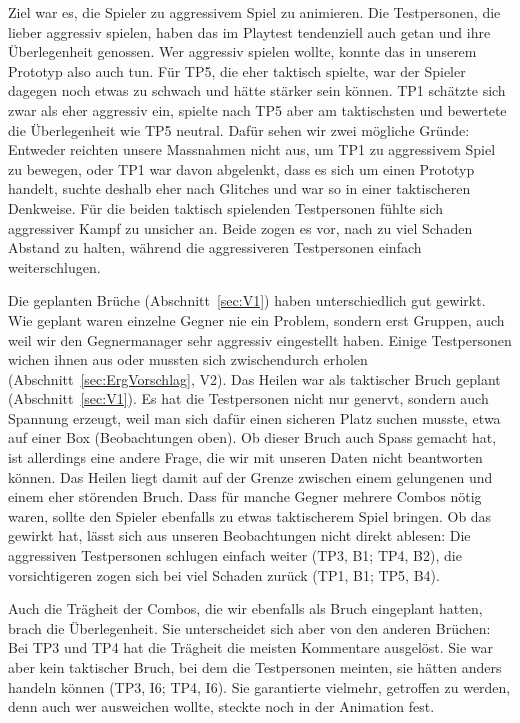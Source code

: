 \documentclass[../Main.tex]{subfiles}
\begin{document}
Ziel war es, die Spieler zu aggressivem Spiel zu animieren. Die Testpersonen, die lieber aggressiv spielen, haben das im Playtest tendenziell auch getan und ihre Überlegenheit genossen. Wer aggressiv spielen wollte, konnte das in unserem Prototyp also auch tun. Für TP5, die eher taktisch spielte, war der Spieler dagegen noch etwas zu schwach und hätte stärker sein können. TP1 schätzte sich zwar als eher aggressiv ein, spielte nach TP5 aber am taktischsten und bewertete die Überlegenheit wie TP5 neutral. Dafür sehen wir zwei mögliche Gründe: Entweder reichten unsere Massnahmen nicht aus, um TP1 zu aggressivem Spiel zu bewegen, oder TP1 war davon abgelenkt, dass es sich um einen Prototyp handelt, suchte deshalb eher nach Glitches und war so in einer taktischeren Denkweise. Für die beiden taktisch spielenden Testpersonen fühlte sich aggressiver Kampf zu unsicher an. Beide zogen es vor, nach zu viel Schaden Abstand zu halten, während die aggressiveren Testpersonen einfach weiterschlugen.

Die geplanten Brüche (Abschnitt~\ref{sec:V1}) haben unterschiedlich gut gewirkt. Wie geplant waren einzelne Gegner nie ein Problem, sondern erst Gruppen, auch weil wir den Gegnermanager sehr aggressiv eingestellt haben. Einige Testpersonen wichen ihnen aus oder mussten sich zwischendurch erholen (Abschnitt~\ref{sec:ErgVorschlag}, V2). Das Heilen war als taktischer Bruch geplant (Abschnitt~\ref{sec:V1}). Es hat die Testpersonen nicht nur genervt, sondern auch Spannung erzeugt, weil man sich dafür einen sicheren Platz suchen musste, etwa auf einer Box (Beobachtungen oben). Ob dieser Bruch auch Spass gemacht hat, ist allerdings eine andere Frage, die wir mit unseren Daten nicht beantworten können. Das Heilen liegt damit auf der Grenze zwischen einem gelungenen und einem eher störenden Bruch. Dass für manche Gegner mehrere Combos nötig waren, sollte den Spieler ebenfalls zu etwas taktischerem Spiel bringen. Ob das gewirkt hat, lässt sich aus unseren Beobachtungen nicht direkt ablesen: Die aggressiven Testpersonen schlugen einfach weiter (TP3, B1; TP4, B2), die vorsichtigeren zogen sich bei viel Schaden zurück (TP1, B1; TP5, B4).

Auch die Trägheit der Combos, die wir ebenfalls als Bruch eingeplant hatten, brach die Überlegenheit. Sie unterscheidet sich aber von den anderen Brüchen: Bei TP3 und TP4 hat die Trägheit die meisten Kommentare ausgelöst. Sie war aber kein taktischer Bruch, bei dem die Testpersonen meinten, sie hätten anders handeln können (TP3, I6; TP4, I6). Sie garantierte vielmehr, getroffen zu werden, denn auch wer ausweichen wollte, steckte noch in der Animation fest.
\end{document}
